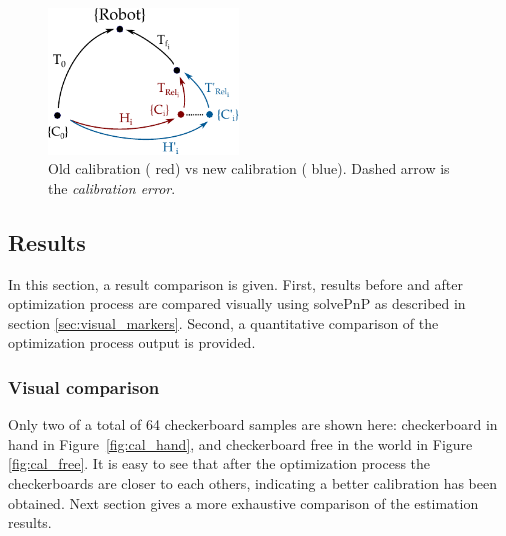 \begin{figure}[!htbp]
 \centering
 \includegraphics[width=0.45\textwidth]{images/update02.pdf}
 \caption{Old calibration ({\color{red} red}) vs new calibration ({\color{blue} blue}). Dashed arrow is the \textit{calibration error}.}
 \label{fig:update02}
\end{figure}


\subsection{Results}
\label{sec:results}

In this section, a result comparison is given. First, results before and after optimization process are compared visually using solvePnP as described in section \ref{sec:visual_markers}. Second, a quantitative comparison of the optimization process output is provided.

\subsubsection{Visual comparison}

Only two of a total of 64 checkerboard samples are shown here: checkerboard in hand in Figure~\ref{fig:cal_hand}, and checkerboard free in the world in Figure \ref{fig:cal_free}. It is easy to see that after the optimization process the checkerboards are closer to each others, indicating a better calibration has been obtained. Next section gives a more exhaustive comparison of the estimation results.
%

